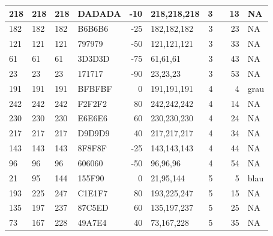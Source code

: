 \documentclass[
]{article}
\begin{document}
\begin{table}
\begin{tabular}[t]{l|l|l|l|r|l|r|l|r|l}
\hline
218 & 218 & 218 & DADADA & -10 & 218,218,218 & 3 & \multicolumn{1}{c}{\cellcolor[HTML]{DADADA}{\textcolor{white}{\#DADADA}}} & 13 & NA\\
\hline
182 & 182 & 182 & B6B6B6 & -25 & 182,182,182 & 3 & \multicolumn{1}{c}{\cellcolor[HTML]{B6B6B6}{\textcolor{white}{\#B6B6B6}}} & 23 & NA\\
\hline
121 & 121 & 121 & 797979 & -50 & 121,121,121 & 3 & \multicolumn{1}{c}{\cellcolor[HTML]{797979}{\textcolor{white}{\#797979}}} & 33 & NA\\
\hline
61 & 61 & 61 & 3D3D3D & -75 & 61,61,61 & 3 & \multicolumn{1}{c}{\cellcolor[HTML]{3D3D3D}{\textcolor{white}{\#3D3D3D}}} & 43 & NA\\
\hline
23 & 23 & 23 & 171717 & -90 & 23,23,23 & 3 & \multicolumn{1}{c}{\cellcolor[HTML]{171717}{\textcolor{white}{\#171717}}} & 53 & NA\\
\hline
191 & 191 & 191 & BFBFBF & 0 & 191,191,191 & 4 & \multicolumn{1}{c}{\cellcolor[HTML]{BFBFBF}{\textcolor{white}{\#BFBFBF}}} & 4 & grau\\
\hline
242 & 242 & 242 & F2F2F2 & 80 & 242,242,242 & 4 & \multicolumn{1}{c}{\cellcolor[HTML]{F2F2F2}{\textcolor{white}{\#F2F2F2}}} & 14 & NA\\
\hline
230 & 230 & 230 & E6E6E6 & 60 & 230,230,230 & 4 & \multicolumn{1}{c}{\cellcolor[HTML]{E6E6E6}{\textcolor{white}{\#E6E6E6}}} & 24 & NA\\
\hline
217 & 217 & 217 & D9D9D9 & 40 & 217,217,217 & 4 & \multicolumn{1}{c}{\cellcolor[HTML]{D9D9D9}{\textcolor{white}{\#D9D9D9}}} & 34 & NA\\
\hline
143 & 143 & 143 & 8F8F8F & -25 & 143,143,143 & 4 & \multicolumn{1}{c}{\cellcolor[HTML]{8F8F8F}{\textcolor{white}{\#8F8F8F}}} & 44 & NA\\
\hline
96 & 96 & 96 & 606060 & -50 & 96,96,96 & 4 & \multicolumn{1}{c}{\cellcolor[HTML]{606060}{\textcolor{white}{\#606060}}} & 54 & NA\\
\hline
21 & 95 & 144 & 155F90 & 0 & 21,95,144 & 5 & \multicolumn{1}{c}{\cellcolor[HTML]{155F90}{\textcolor{white}{\#155F90}}} & 5 & blau\\
\hline
193 & 225 & 247 & C1E1F7 & 80 & 193,225,247 & 5 & \multicolumn{1}{c}{\cellcolor[HTML]{C1E1F7}{\textcolor{white}{\#C1E1F7}}} & 15 & NA\\
\hline
135 & 197 & 237 & 87C5ED & 60 & 135,197,237 & 5 & \multicolumn{1}{c}{\cellcolor[HTML]{87C5ED}{\textcolor{white}{\#87C5ED}}} & 25 & NA\\
\hline
73 & 167 & 228 & 49A7E4 & 40 & 73,167,228 & 5 & \multicolumn{1}{c}{\cellcolor[HTML]{49A7E4}{\textcolor{white}{\#49A7E4}}} & 35 & NA\\

\end{tabular}
\end{table}
\end{document}
